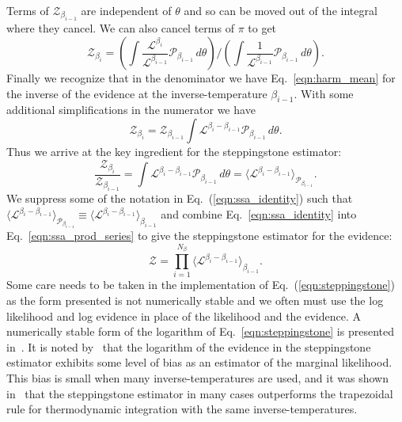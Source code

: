 Terms of $\mathcal{Z}_{\beta_{i-1}}$ are independent of $\theta$ and so can be moved out of the integral where they cancel. We can also cancel terms of $\pi$ to get
\begin{equation}
    \mathcal{Z}_{\beta_i} = \left(\int \frac{ \mathcal{L}^{\beta_i} }{\mathcal{L}^{\beta_{i-1}}} \mathcal{P}_{\beta_{i-1}} \, d\theta\right) \bigg / \left(\int \frac{1}{ \mathcal{L}^{\beta_{i-1}}} \mathcal{P}_{\beta_{i-1}} \, d\theta\right).
\end{equation}
Finally we recognize that in the denominator we have Eq.~\ref{eqn:harm_mean} for the inverse of the evidence at the inverse-temperature $\beta_{i-1}$. With some additional simplifications in the numerator we have
\begin{equation}
    \mathcal{Z}_{\beta_i} = \mathcal{Z}_{\beta_{i-1}} \int \mathcal{L}^{\beta_i - \beta_{i-1}}  \mathcal{P}_{\beta_{i-1}} \, d\theta.
\end{equation}
Thus we arrive at the key ingredient for the steppingstone estimator:
\begin{equation}\label{eqn:ssa_identity}
    \frac{\mathcal{Z}_{\beta_i}}{\mathcal{Z}_{\beta_{i-1}}} = \int \mathcal{L}^{\beta_i - \beta_{i-1}}  \mathcal{P}_{\beta_{i-1}} \, d\theta = \langle \mathcal{L}^{\beta_i - \beta_{i-1}} \rangle_{\mathcal{P}_{\beta_{i-1}}}.
\end{equation}
We suppress some of the notation in Eq.~(\ref{eqn:ssa_identity}) such that $\langle \mathcal{L}^{\beta_i - \beta_{i-1}} \rangle_{\mathcal{P}_{\beta_{i-1}}} \equiv \langle \mathcal{L}^{\beta_i - \beta_{i-1}} \rangle_{\beta_{i-1}}$ and combine Eq.~\ref{eqn:ssa_identity} into Eq.~\ref{eqn:ssa_prod_series} to  give the steppingstone estimator for the evidence:
\begin{equation}\label{eqn:steppingstone}
    \mathcal{Z} = \prod_{i=1}^{N_\beta} \langle \mathcal{L}^{\beta_i - \beta_{i-1}} \rangle_{\beta_{i-1}}. 
\end{equation}
Some care needs to be taken in the implementation of Eq.~(\ref{eqn:steppingstone}) as the form presented is not numerically stable and we often must use the log likelihood and log evidence in place of the likelihood and the evidence. A numerically stable form of the logarithm of Eq.~\ref{eqn:steppingstone} is presented in~\cite{xie2010improving}. It is noted by~\cite{xie2010improving} that the logarithm of the evidence in the steppingstone estimator exhibits some level of bias as an estimator of the marginal likelihood. This bias is small when many inverse-temperatures are used, and it was shown in~\cite{xie2010improving} that the steppingstone estimator in many cases outperforms the trapezoidal rule for thermodynamic integration with the same inverse-temperatures.

